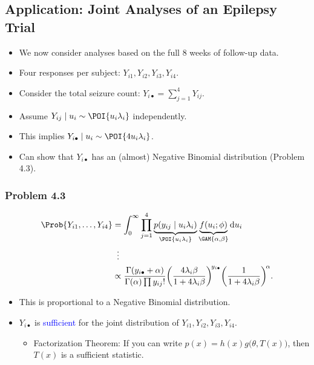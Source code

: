 \documentclass[oneside]{book}\usepackage[]{graphicx}\usepackage[svgnames]{xcolor}
\begin{document}
\subsection*{Application: Joint Analyses of an Epilepsy Trial}
\begin{itemize}
      \item We now consider analyses based on the full 8 weeks of follow-up data.
      \item Four responses per subject: $ Y_{i1},Y_{i2},Y_{i3},Y_{i4} $.
      \item Consider the total seizure count: $ Y_{i\bullet}=\sum_{j=1}^{4}Y_{ij} $.
      \item Assume $ Y_{ij}\mid u_i \sim \POI{u_i\lambda_i} $ independently.
      \item This implies $ Y_{i\bullet}\mid u_i \sim \POI{4u_i\lambda_i} $.
      \item Can show that $ Y_{i\bullet} $ has an (almost) Negative Binomial distribution (Problem 4.3).
\end{itemize}
\subsubsection*{Problem 4.3}
\begin{align*}
      \Prob{Y_{i1},\ldots,Y_{i4}}
       & =\int_{0}^{\infty}\prod_{j=1}^4\underbrace{p(y_{ij}\mid u_i\lambda_i)}_{\POI{u_i\lambda_i}}\underbrace{f(u_i;\phi)}_{\GAM{\alpha,\beta}}\odif{u_i}                                                   \\
       & \vdotswithin{=}                                                                                                                                                                                      \\
       & \propto \frac{\Gamma(y_{i\bullet}+\alpha)}{\Gamma(\alpha)\prod y_{ij}!}\biggl(\frac{4\lambda_i\beta}{1+4\lambda_i\beta}\biggr)^{\!y_{i\bullet}}\biggl(\frac{1}{1+4\lambda_i\beta}\biggr)^{\!\alpha}.
\end{align*}
\begin{itemize}
      \item This is proportional to a Negative Binomial distribution.
      \item $ Y_{i\bullet} $ is \textcolor{Blue}{sufficient} for the joint distribution of $ Y_{i1},Y_{i2},Y_{i3},Y_{i4} $.
            \begin{itemize}
                  \item Factorization Theorem: If you can write $ p(x)=h(x)g\bigl(\theta,T(x)\bigr) $, then $ T(x) $ is a sufficient statistic.
            \end{itemize}
\end{itemize}
\end{document}
